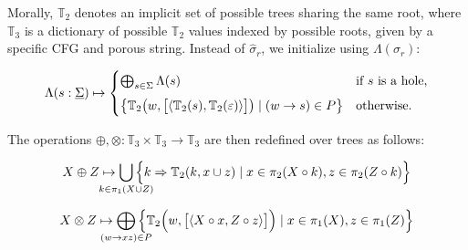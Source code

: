 \documentclass[portrait,a0b,final,a4resizeable]{a0poster}
\def\jointspacing{\vspace{0.3in}}
\begin{document}
\begin{poster}
\begin{multicols}{2}
      \vspace{1.5cm}

      \hspace*{2cm}\begin{minipage}[c]{0.90\columnwidth}
      Morally, $\mathbb{T}_2$ denotes an implicit set of possible trees sharing the same root, where $\mathbb{T}_3$ is a dictionary of possible $\mathbb{T}_2$ values indexed by possible roots, given by a specific CFG and porous string. Instead of $\hat\sigma_r$, we initialize using $\Lambda(\sigma_r)$:
      \end{minipage}

      \[
           \Lambda(s: \underline\Sigma) \mapsto \begin{cases}
               \bigoplus_{s\in \Sigma} \Lambda(s) & \text{if $s$ is a hole,} \vspace{5pt}\\
               \big\{\mathbb{T}_2\big(w, \big[\langle\mathbb{T}_2(s), \mathbb{T}_2(\varepsilon)\rangle\big]\big) \mid (w \rightarrow s)\in P\big\} & \text{otherwise.}
           \end{cases}
      \]
%
      \hspace*{2cm}\begin{minipage}[c]{0.90\columnwidth}
      The operations $\oplus, \otimes: \mathbb{T}_3 \times \mathbb{T}_3 \rightarrow \mathbb{T}_3$ are then redefined over trees as follows:
      \end{minipage}

      \[
          X \oplus Z \mapsto \bigcup_{\mathclap{k\in \pi_1(X \cup Z)}}\Big\{k \Rightarrow \mathbb{T}_2(k, x \cup z) \mid x \in \pi_2(X\circ k), z \in \pi_2(Z\circ k)\Big\}
      \]

      \[
        X \otimes Z \mapsto \bigoplus_{\mathclap{(w\rightarrow xz) \in P}}\Big\{\mathbb{T}_2\Big(w, \big[\langle X\circ x, Z\circ z\rangle\big]\Big) \mid x \in \pi_1(X), z \in \pi_1(Z)\Big\}
      \]
%

      \vspace{-0.5cm}
      \jointspacing


\end{multicols}
\end{poster}
\end{document}
